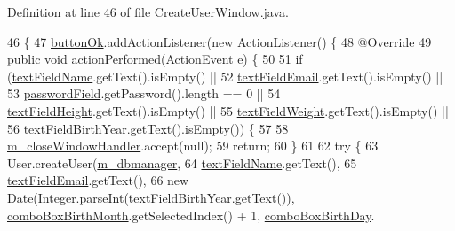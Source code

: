 Definition at line 46 of file Create\+User\+Window.\+java.


\begin{DoxyCode}
46                                         \{
47         \mbox{\hyperlink{classcom_1_1activitytracker_1_1_create_user_window_aa22864c8baa65b46fe9a7621748d7841}{buttonOk}}.addActionListener(\textcolor{keyword}{new} ActionListener() \{
48             @Override
49             \textcolor{keyword}{public} \textcolor{keywordtype}{void} actionPerformed(ActionEvent e) \{
50 
51                 \textcolor{keywordflow}{if} (\mbox{\hyperlink{classcom_1_1activitytracker_1_1_create_user_window_aa2b8cf1781a8a1534dbf5c5b98332c05}{textFieldName}}.getText().isEmpty() ||
52                         \mbox{\hyperlink{classcom_1_1activitytracker_1_1_create_user_window_a4f6010631cb7be5a2ae3691bdca31483}{textFieldEmail}}.getText().isEmpty() ||
53                         \mbox{\hyperlink{classcom_1_1activitytracker_1_1_create_user_window_a29be9c267c003ae90731199d8257dc0a}{passwordField}}.getPassword().length == 0 ||
54                         \mbox{\hyperlink{classcom_1_1activitytracker_1_1_create_user_window_ac5ce2bc2efbc06d578d93fb3f26aad1c}{textFieldHeight}}.getText().isEmpty() ||
55                         \mbox{\hyperlink{classcom_1_1activitytracker_1_1_create_user_window_ae84b4d977150419bfabc11fbd009392c}{textFieldWeight}}.getText().isEmpty() ||
56                         \mbox{\hyperlink{classcom_1_1activitytracker_1_1_create_user_window_a4a0980af9377429dcb012507bc1ed3b9}{textFieldBirthYear}}.getText().isEmpty()) \{
57 
58                     \mbox{\hyperlink{classcom_1_1activitytracker_1_1_create_user_window_a8fd1d7fb3c2f1913d2c44fd1d475a20a}{m\_closeWindowHandler}}.accept(null);
59                     \textcolor{keywordflow}{return};
60                 \}
61 
62                 \textcolor{keywordflow}{try} \{
63                     User.createUser(\mbox{\hyperlink{classcom_1_1activitytracker_1_1_create_user_window_adab0a80c7975dfad1c2882a56f00a235}{m\_dbmanager}},
64                             \mbox{\hyperlink{classcom_1_1activitytracker_1_1_create_user_window_aa2b8cf1781a8a1534dbf5c5b98332c05}{textFieldName}}.getText(),
65                             \mbox{\hyperlink{classcom_1_1activitytracker_1_1_create_user_window_a4f6010631cb7be5a2ae3691bdca31483}{textFieldEmail}}.getText(),
66                             \textcolor{keyword}{new} Date(Integer.parseInt(\mbox{\hyperlink{classcom_1_1activitytracker_1_1_create_user_window_a4a0980af9377429dcb012507bc1ed3b9}{textFieldBirthYear}}.getText()), 
      \mbox{\hyperlink{classcom_1_1activitytracker_1_1_create_user_window_acb63cb981ace7286e1712938ce2ffc58}{comboBoxBirthMonth}}.getSelectedIndex() + 1, \mbox{\hyperlink{classcom_1_1activitytracker_1_1_create_user_window_a9b5d614cb11ff1bd1bf789ec6e72757f}{comboBoxBirthDay}}.

\end{DoxyCode}
